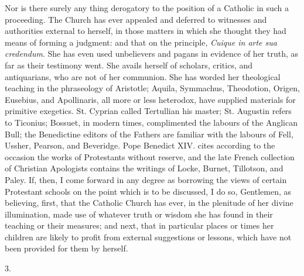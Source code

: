 Nor is there surely any thing derogatory to the position of a
Catholic in such a proceeding. The Church has ever appealed and
deferred to witnesses and authorities external to herself, in those
matters in which she thought they had means of forming a judgment: and
that on the principle, \emph{Cuique in arte sua credendum}. She has
even used unbelievers and pagans in evidence of her truth, as far as
their testimony went. She avails herself of scholars, critics, and
antiquarians, who are not of her communion. She has worded her
theological teaching in the phraseology of Aristotle; Aquila,
Symmachus, Theodotion, Origen, Eusebius, and Apollinaris, all more or
less heterodox, have supplied materials for primitive exegetics. St.
Cyprian called Tertullian his master; St. Augustin refers to
Ticonius; Bossuet, in modern times, complimented the labours of the
Anglican Bull; the Benedictine editors of the Fathers are familiar
with the labours of Fell, Ussher, Pearson, and Beveridge. Pope
Benedict XIV. cites according to the occasion the works of Protestants
without reserve, and the late French collection of Christian
Apologists contains the writings of Locke, Burnet, Tillotson, and
Paley. If, then, I come forward in any degree as borrowing the views
of certain Protestant schools on the point which is to be discussed, I
do so, Gentlemen, as believing, first, that the Catholic Church has
ever, in the plenitude of her divine illumination, made use of
whatever truth or wisdom she has found in their teaching or their
measures; and next, that in particular places or times her children
are likely to profit from external suggestions or lessons, which have
not been provided for them by herself.

3.

